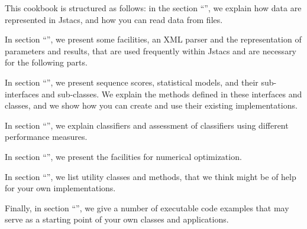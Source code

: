 This cookbook is structured as follows: in the section ``'', we explain how data are represented in Jstacs, and how you can read data from files. 

In section ``'', we present some facilities, an XML parser and the representation of parameters and results, that are used frequently within Jstacs and are necessary for the following parts. 

In section ``'', we present sequence scores, statistical models, and their sub-interfaces and sub-classes. We explain the methods defined in these interfaces and classes, and we show how you can create and use their existing implementations.

In section ``'', we explain classifiers and assessment of classifiers using different performance measures.

In section ``'', we present the facilities for numerical optimization.

In section ``'', we list utility classes and methods, that we think might be of help for your own implementations.

Finally, in section ``'', we give a number of executable code examples that may serve as a starting point of your own classes and applications.
